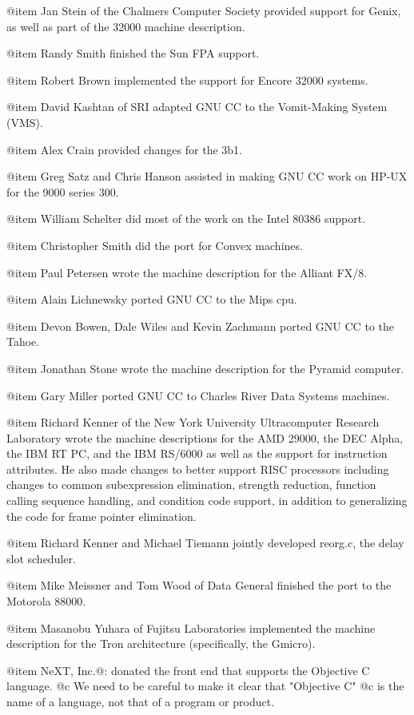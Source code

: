 @item
Jan Stein of the Chalmers Computer Society provided support for
Genix, as well as part of the 32000 machine description.

@item
Randy Smith finished the Sun FPA support.

@item
Robert Brown implemented the support for Encore 32000 systems.

@item
David Kashtan of SRI adapted GNU CC to the Vomit-Making System (VMS).

@item
Alex Crain provided changes for the 3b1.

@item
Greg Satz and Chris Hanson assisted in making GNU CC work on HP-UX for
the 9000 series 300.

@item
William Schelter did most of the work on the Intel 80386 support.

@item
Christopher Smith did the port for Convex machines.

@item
Paul Petersen wrote the machine description for the Alliant FX/8.

@item
Alain Lichnewsky ported GNU CC to the Mips cpu.

@item
Devon Bowen, Dale Wiles and Kevin Zachmann ported GNU CC to the Tahoe.

@item
Jonathan Stone wrote the machine description for the Pyramid computer.

@item
Gary Miller ported GNU CC to Charles River Data Systems machines.

@item
Richard Kenner of the New York University Ultracomputer Research
Laboratory wrote the machine descriptions for the AMD 29000, the DEC
Alpha, the IBM RT PC, and the IBM RS/6000 as well as the support for
instruction attributes.  He also made changes to better support RISC
processors including changes to common subexpression elimination,
strength reduction, function calling sequence handling, and condition
code support, in addition to generalizing the code for frame pointer
elimination.

@item
Richard Kenner and Michael Tiemann jointly developed reorg.c, the delay
slot scheduler.

@item
Mike Meissner and Tom Wood of Data General finished the port to the
Motorola 88000.

@item 
Masanobu Yuhara of Fujitsu Laboratories implemented the machine
description for the Tron architecture (specifically, the Gmicro).

@item
NeXT, Inc.@: donated the front end that supports the Objective C
language.
@c We need to be careful to make it clear that "Objective C"
@c is the name of a language, not that of a program or product.


